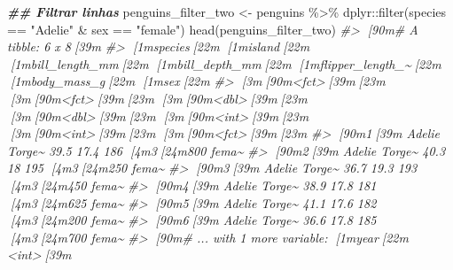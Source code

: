 \documentclass[
]{book}
\newenvironment{Shaded}{\begin{snugshade}}{\end{snugshade}}
\newcommand{\CommentTok}[1]{\textcolor[rgb]{0.37,0.37,0.37}{\textit{#1}}}
\newcommand{\DocumentationTok}[1]{\textcolor[rgb]{0.37,0.37,0.37}{\textbf{\textit{#1}}}}
\newcommand{\FunctionTok}[1]{\textcolor[rgb]{0,0,0}{#1}}
\newcommand{\NormalTok}[1]{#1}
\newcommand{\OtherTok}[1]{\textcolor[rgb]{0.37,0.37,0.37}{#1}}
\newcommand{\SpecialCharTok}[1]{\textcolor[rgb]{0,0,0}{#1}}
\newcommand{\StringTok}[1]{\textcolor[rgb]{0.5,0.5,0.5}{#1}}
\begin{document}
\begin{Shaded}
\begin{Highlighting}[]
\DocumentationTok{\#\# Filtrar linhas}
\NormalTok{penguins\_filter\_two }\OtherTok{\textless{}{-}}\NormalTok{ penguins }\SpecialCharTok{\%\textgreater{}\%} 
\NormalTok{  dplyr}\SpecialCharTok{::}\FunctionTok{filter}\NormalTok{(species }\SpecialCharTok{==} \StringTok{"Adelie"} \SpecialCharTok{\&}\NormalTok{ sex }\SpecialCharTok{==} \StringTok{"female"}\NormalTok{)}
\FunctionTok{head}\NormalTok{(penguins\_filter\_two)}
\CommentTok{\#\textgreater{} [90m\# A tibble: 6 x 8[39m}
\CommentTok{\#\textgreater{}   [1mspecies[22m [1misland[22m [1mbill\_length\_mm[22m [1mbill\_depth\_mm[22m [1mflipper\_length\_\textasciitilde{}[22m [1mbody\_mass\_g[22m [1msex[22m  }
\CommentTok{\#\textgreater{}   [3m[90m\textless{}fct\textgreater{}[39m[23m   [3m[90m\textless{}fct\textgreater{}[39m[23m           [3m[90m\textless{}dbl\textgreater{}[39m[23m         [3m[90m\textless{}dbl\textgreater{}[39m[23m            [3m[90m\textless{}int\textgreater{}[39m[23m       [3m[90m\textless{}int\textgreater{}[39m[23m [3m[90m\textless{}fct\textgreater{}[39m[23m}
\CommentTok{\#\textgreater{} [90m1[39m Adelie  Torge\textasciitilde{}           39.5          17.4              186        [4m3[24m800 fema\textasciitilde{}}
\CommentTok{\#\textgreater{} [90m2[39m Adelie  Torge\textasciitilde{}           40.3          18                195        [4m3[24m250 fema\textasciitilde{}}
\CommentTok{\#\textgreater{} [90m3[39m Adelie  Torge\textasciitilde{}           36.7          19.3              193        [4m3[24m450 fema\textasciitilde{}}
\CommentTok{\#\textgreater{} [90m4[39m Adelie  Torge\textasciitilde{}           38.9          17.8              181        [4m3[24m625 fema\textasciitilde{}}
\CommentTok{\#\textgreater{} [90m5[39m Adelie  Torge\textasciitilde{}           41.1          17.6              182        [4m3[24m200 fema\textasciitilde{}}
\CommentTok{\#\textgreater{} [90m6[39m Adelie  Torge\textasciitilde{}           36.6          17.8              185        [4m3[24m700 fema\textasciitilde{}}
\CommentTok{\#\textgreater{} [90m\# ... with 1 more variable: [1myear[22m \textless{}int\textgreater{}[39m}


\end{Highlighting}
\end{Shaded}
\end{document}
